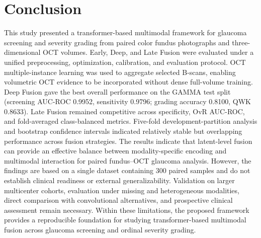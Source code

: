 \documentclass[sn-mathphys]{sn-jnl}%
\theoremstyle{thmstyleone}%
\theoremstyle{thmstyletwo}%
\theoremstyle{thmstylethree}%
\begin{document}
\section{Conclusion}
\label{sec:conclusion}

This study presented a transformer-based multimodal framework for glaucoma screening and severity grading from paired color fundus photographs and three-dimensional OCT volumes. Early, Deep, and Late Fusion were evaluated under a unified preprocessing, optimization, calibration, and evaluation protocol. OCT multiple-instance learning was used to aggregate selected B-scans, enabling volumetric OCT evidence to be incorporated without dense full-volume training.
Deep Fusion gave the best overall performance on the GAMMA test split (screening AUC-ROC 0.9952, sensitivity 0.9796; grading accuracy 0.8100, QWK 0.8633). Late Fusion remained competitive across specificity, OvR AUC-ROC, and fold-averaged class-balanced metrics. Five-fold development-partition analysis and bootstrap confidence intervals indicated relatively stable but overlapping performance across fusion strategies.
The results indicate that latent-level fusion can provide an effective balance between modality-specific encoding and multimodal interaction for paired fundus--OCT glaucoma analysis. However, the findings are based on a single dataset containing 300 paired samples and do not establish clinical readiness or external generalizability. Validation on larger multicenter cohorts, evaluation under missing and heterogeneous modalities, direct comparison with convolutional alternatives, and prospective clinical assessment remain necessary. Within these limitations, the proposed framework provides a reproducible foundation for studying transformer-based multimodal fusion across glaucoma screening and ordinal severity grading.


\end{document}

